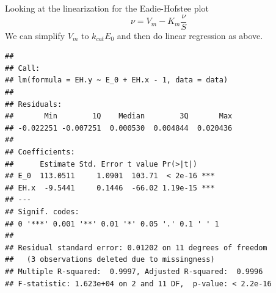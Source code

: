 \documentclass[
]{article}
\newenvironment{Shaded}{\begin{snugshade}}{\end{snugshade}}
\newcommand{\AttributeTok}[1]{\textcolor[rgb]{0.13,0.29,0.53}{#1}}
\newcommand{\DecValTok}[1]{\textcolor[rgb]{0.00,0.00,0.81}{#1}}
\newcommand{\FunctionTok}[1]{\textcolor[rgb]{0.13,0.29,0.53}{\textbf{#1}}}
\newcommand{\NormalTok}[1]{#1}
\newcommand{\OtherTok}[1]{\textcolor[rgb]{0.56,0.35,0.01}{#1}}
\newcommand{\SpecialCharTok}[1]{\textcolor[rgb]{0.81,0.36,0.00}{\textbf{#1}}}
\newcommand{\StringTok}[1]{\textcolor[rgb]{0.31,0.60,0.02}{#1}}
\begin{document}
Looking at the linearization for the Eadie-Hofstee plot
\[\nu = V_m - K_m \frac{\nu}{S}\]
We can simplify \(V_m\) to \(k_{cat}E_0\) and then do linear regression as above.

\begin{Shaded}
\end{Shaded}

\begin{verbatim}
## 
## Call:
## lm(formula = EH.y ~ E_0 + EH.x - 1, data = data)
## 
## Residuals:
##       Min        1Q    Median        3Q       Max 
## -0.022251 -0.007251  0.000530  0.004844  0.020436 
## 
## Coefficients:
##      Estimate Std. Error t value Pr(>|t|)    
## E_0  113.0511     1.0901  103.71  < 2e-16 ***
## EH.x  -9.5441     0.1446  -66.02 1.19e-15 ***
## ---
## Signif. codes:  
## 0 '***' 0.001 '**' 0.01 '*' 0.05 '.' 0.1 ' ' 1
## 
## Residual standard error: 0.01202 on 11 degrees of freedom
##   (3 observations deleted due to missingness)
## Multiple R-squared:  0.9997, Adjusted R-squared:  0.9996 
## F-statistic: 1.623e+04 on 2 and 11 DF,  p-value: < 2.2e-16
\end{verbatim}

\begin{Shaded}
\end{Shaded}
\end{document}
